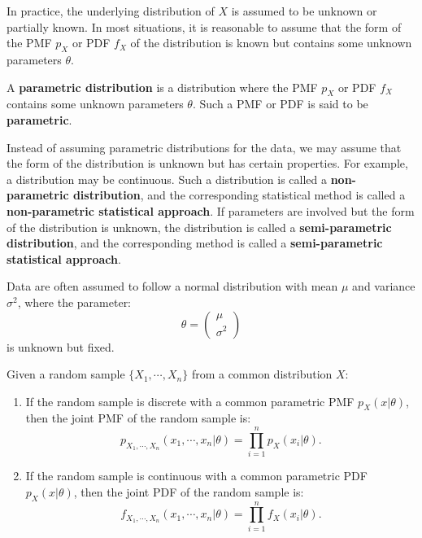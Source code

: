 \documentclass{huhtakm-template-book-v2}
\begin{document}
    In practice, the underlying distribution of $X$ is assumed to be unknown or partially known. In most situations, it is reasonable to assume that the form of the PMF $p_{X}$ or PDF $f_{X}$ of the distribution is known but contains some unknown parameters $\theta$.
    \begin{defn}
        A \textbf{parametric distribution} is a distribution where the PMF $p_{X}$ or PDF $f_{X}$ contains some unknown parameters $\theta$. Such a PMF or PDF is said to be \textbf{parametric}.
    \end{defn}
    \begin{rem}
        Instead of assuming parametric distributions for the data, we may assume that the form of the distribution is unknown but has certain properties. For example, a distribution may be continuous. Such a distribution is called a \textbf{non-parametric distribution}, and the corresponding statistical method is called a \textbf{non-parametric statistical approach}. If parameters are involved but the form of the distribution is unknown, the distribution is called a \textbf{semi-parametric distribution}, and the corresponding method is called a \textbf{semi-parametric statistical approach}.
    \end{rem}
    \begin{eg}
        Data are often assumed to follow a normal distribution with mean $\mu$ and variance $\sigma^{2}$, where the parameter:
        \begin{equation*}
            \theta = \begin{pmatrix}
                \mu\\
                \sigma^{2}
            \end{pmatrix}
        \end{equation*}
        is unknown but fixed.
    \end{eg}
    \begin{lem}
        Given a random sample $\{X_{1},\cdots,X_{n}\}$ from a common distribution $X$:
        \begin{enumerate}
            \item If the random sample is discrete with a common parametric PMF $p_{X}(x|\theta)$, then the joint PMF of the random sample is:
            \begin{equation*}
                p_{X_{1},\cdots,X_{n}}(x_{1},\cdots,x_{n}|\theta) = \prod_{i=1}^{n} p_{X}(x_{i}|\theta).
            \end{equation*}
            \item If the random sample is continuous with a common parametric PDF $p_{X}(x|\theta)$, then the joint PDF of the random sample is:
            \begin{equation*}
                f_{X_{1},\cdots,X_{n}}(x_{1},\cdots,x_{n}|\theta) = \prod_{i=1}^{n} f_{X}(x_{i}|\theta).
            \end{equation*}
        \end{enumerate}
    \end{lem}
    \newpage
\end{document}
